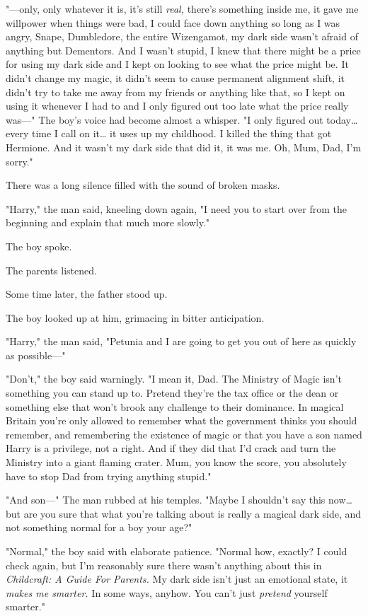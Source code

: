 "---only, only whatever it is, it's still \emph{real,} there's something inside
me, it gave me willpower when things were bad, I could face down anything so
long as I was angry, Snape, Dumbledore, the entire Wizengamot, my dark side
wasn't afraid of anything but Dementors. And I wasn't stupid, I knew that there
might be a price for using my dark side and I kept on looking to see what the
price might be. It didn't change my magic, it didn't seem to cause permanent
alignment shift, it didn't try to take me away from my friends or anything like
that, so I kept on using it whenever I had to and I only figured out too late
what the price really was---" The boy's voice had become almost a whisper. "I
only figured out today{\ldots} every time I call on it{\ldots} it uses up my
childhood. I killed the thing that got Hermione. And it wasn't my dark side
that did it, it was me. Oh, Mum, Dad, I'm sorry."

There was a long silence filled with the sound of broken masks.

"Harry," the man said, kneeling down again, "I need you to start over from the
beginning and explain that much more slowly."

The boy spoke.

The parents listened.

Some time later, the father stood up.

The boy looked up at him, grimacing in bitter anticipation.

"Harry," the man said, "Petunia and I are going to get you out of here as
quickly as possible---"

"Don't," the boy said warningly. "I mean it, Dad. The Ministry of Magic isn't
something you can stand up to. Pretend they're the tax office or the dean or
something else that won't brook any challenge to their dominance. In magical
Britain you're only allowed to remember what the government thinks you should
remember, and remembering the existence of magic or that you have a son named
Harry is a privilege, not a right. And if they did that I'd crack and turn the
Ministry into a giant flaming crater. Mum, you know the score, you absolutely
have to stop Dad from trying anything stupid."

"And son---" The man rubbed at his temples. "Maybe I shouldn't say this
now{\ldots} but are you sure that what you're talking about is really a magical
dark side, and not something normal for a boy your age?"

"Normal," the boy said with elaborate patience. "Normal how, exactly? I could
check again, but I'm reasonably sure there wasn't anything about this in
\emph{Childcraft: A Guide For Parents.} My dark side isn't just an emotional
state, it \emph{makes me smarter.} In some ways, anyhow. You can't just
\emph{pretend} yourself smarter."

